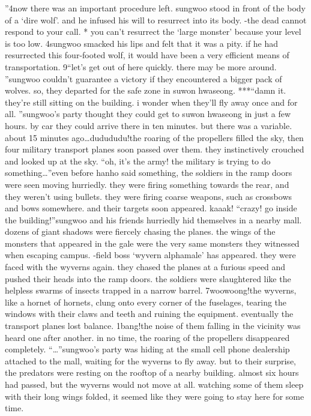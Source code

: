 ”4now there was an important procedure left.
 sungwoo stood in front of the body of a ‘dire wolf’.
 and he infused his will to resurrect into its body.
-the dead cannot respond to your call.
* you can’t resurrect the ‘large monster’ because your level is too low.
4sungwoo smacked his lips and felt that it was a pity.
 if he had resurrected this four-footed wolf, it would have been a very efficient means of transportation.
9“let’s get out of here quickly.
 there may be more around.
”sungwoo couldn’t guarantee a victory if they encountered a bigger pack of wolves.
so, they departed for the safe zone in suwon hwaseong.
***“damn it.
 they’re still sitting on the building.
 i wonder when they’ll fly away once and for all.
”sungwoo’s party thought they could get to suwon hwaseong in just a few hours.
 by car they could arrive there in ten minutes.
 but there was a variable.
 about 15 minutes ago…dudududu!the roaring of the propellers filled the sky, then four military transport planes soon passed over them.
 they instinctively crouched and looked up at the sky.
“oh, it’s the army! the military is trying to do something…”even before hanho said something, the soldiers in the ramp doors were seen moving hurriedly.
they were firing something towards the rear, and they weren’t using bullets.
 they were firing coarse weapons, such as crossbows and bows somewhere.
 and their targets soon appeared.
kaaak!
“crazy! go inside the building!”sungwoo and his friends hurriedly hid themselves in a nearby mall.
dozens of giant shadows were fiercely chasing the planes.
the wings of the monsters that appeared in the gale were the very same monsters they witnessed when escaping campus.
-field boss ‘wyvern alphamale’ has appeared.
they were faced with the wyverns again.
 they chased the planes at a furious speed and pushed their heads into the ramp doors.
 the soldiers were slaughtered like the helpless swarms of insects trapped in a narrow barrel.
7woowoong!the wyverns, like a hornet of hornets, clung onto every corner of the fuselages, tearing the windows with their claws and teeth and ruining the equipment.
 eventually the transport planes lost balance.
1bang!the noise of them falling in the vicinity was heard one after another.
in no time, the roaring of the propellers disappeared completely.
“…”sungwoo’s party was hiding at the small cell phone dealership attached to the mall, waiting for the wyverns to fly away.
 but to their surprise, the predators were resting on the rooftop of a nearby building.
 almost six hours had passed, but the wyverns would not move at all.
 watching some of them sleep with their long wings folded, it seemed like they were going to stay here for some time.
